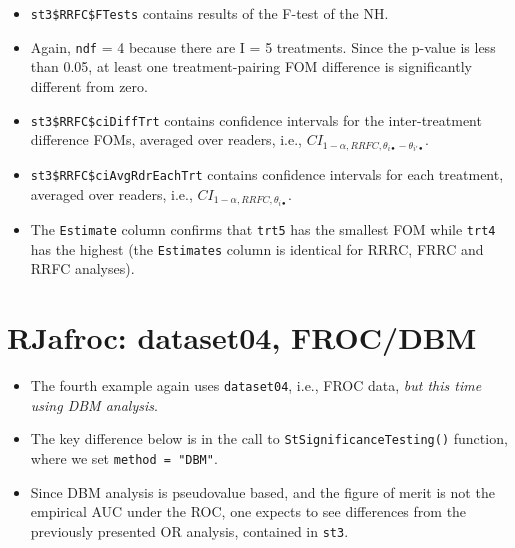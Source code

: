 \documentclass[
]{book}
\providecommand{\tightlist}{%
  \setlength{\itemsep}{0pt}\setlength{\parskip}{0pt}}
\begin{document}
\begin{itemize}
\item
  \texttt{st3\$RRFC\$FTests} contains results of the F-test of the NH.
\item
  Again, \texttt{ndf} = 4 because there are I = 5 treatments. Since the p-value is less than 0.05, at least one treatment-pairing FOM difference is significantly different from zero.
\item
  \texttt{st3\$RRFC\$ciDiffTrt} contains confidence intervals for the inter-treatment difference FOMs, averaged over readers, i.e., \(CI_{1-\alpha,RRFC,\theta_{i \bullet} - \theta_{i' \bullet}}\).
\item
  \texttt{st3\$RRFC\$ciAvgRdrEachTrt} contains confidence intervals for each treatment, averaged over readers, i.e., \(CI_{1-\alpha,RRFC,\theta_{i \bullet}}\).
\item
  The \texttt{Estimate} column confirms that \texttt{trt5} has the smallest FOM while \texttt{trt4} has the highest (the \texttt{Estimates} column is identical for RRRC, FRRC and RRFC analyses).
\end{itemize}

\hypertarget{or-applications-dataset04-FROC-DBM-RJafroc}{%
\section{RJafroc: dataset04, FROC/DBM}\label{or-applications-dataset04-FROC-DBM-RJafroc}}

\begin{itemize}
\tightlist
\item
  The fourth example again uses \texttt{dataset04}, i.e., FROC data, \emph{but this time using DBM analysis}.
\item
  The key difference below is in the call to \texttt{StSignificanceTesting()} function, where we set \texttt{method\ =\ "DBM"}.
\item
  Since DBM analysis is pseudovalue based, and the figure of merit is not the empirical AUC under the ROC, one expects to see differences from the previously presented OR analysis, contained in \texttt{st3}.
\end{itemize}
\end{document}

